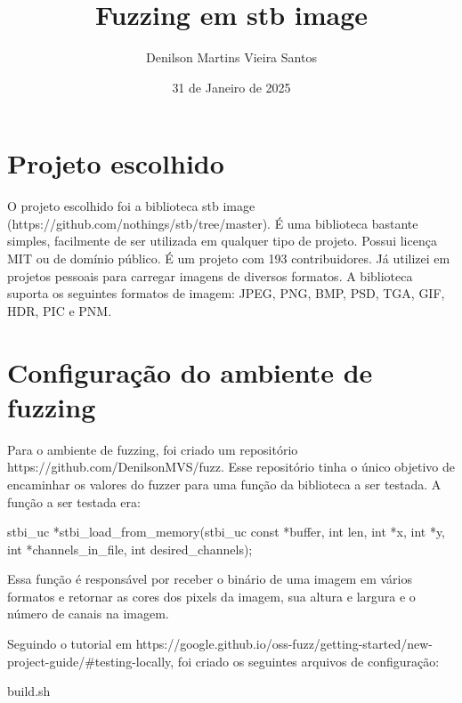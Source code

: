 \documentclass[a4paper,12pt]{article}
\title{Fuzzing em stb image}
\author{Denilson Martins Vieira Santos}
\date{31 de Janeiro de 2025}  %
\begin{document}
\maketitle  %

\tableofcontents  %

\section{Projeto escolhido}

O projeto escolhido foi a biblioteca stb image (https://github.com/nothings/stb/tree/master).
É uma biblioteca bastante simples, facilmente de ser utilizada em qualquer tipo de projeto. Possui
licença MIT ou de domínio público. É um projeto com 193 contribuidores. Já utilizei em projetos
pessoais para carregar imagens de diversos formatos. A biblioteca suporta os seguintes formatos
de imagem: JPEG, PNG, BMP, PSD, TGA, GIF, HDR, PIC e PNM.

\section{Configuração do ambiente de fuzzing}

Para o ambiente de fuzzing, foi criado um repositório https://github.com/DenilsonMVS/fuzz. Esse repositório
tinha o único objetivo de encaminhar os valores do fuzzer para uma função da biblioteca a ser testada. A
função a ser testada era:


stbi_uc *stbi_load_from_memory(stbi_uc const *buffer, int len, int *x, int *y, int *channels_in_file, int desired_channels);

Essa função é responsável por receber o binário de uma imagem em vários formatos e retornar
as cores dos pixels da imagem, sua altura e largura e o número de canais na imagem.

Seguindo o tutorial em https://google.github.io/oss-fuzz/getting-started/new-project-guide/#testing-locally,
foi criado os seguintes arquivos de configuração:



build.sh



\end{document}
